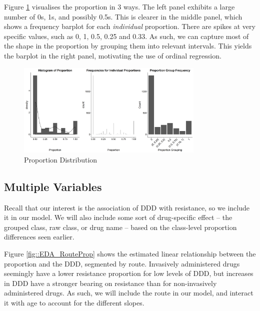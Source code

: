 \documentclass[11pt,twoside]{article}
\numberwithin{Theorem}{section}
\numberwithin{Definition}{section}
\numberwithin{Lemma}{section}
\numberwithin{Algorithm}{section}
\numberwithin{equation}{section}
\begin{document}
\newpage
Figure \ref{fig::2_1_EDA_Prop} visualises the proportion in 3 ways. The left panel exhibits a large number of 0s, 1s, and possibly 0.5s. This is clearer in the middle panel, which shows a frequency barplot for each \textit{individual} proportion. There are spikes at very specific values, such as 0, 1, 0.5, 0.25 and 0.33. As such, we can capture most of the shape in the proportion by grouping them into relevant intervals. This yields the barplot in the right panel, motivating the use of ordinal regression. 

\begin{figure}[!h]
	\centering
	\includegraphics[width = 0.8\textwidth, height = 0.23\textheight]{Figures/2_1_EDA_Prop.png}
	\caption{Proportion Distribution} \label{fig::2_1_EDA_Prop}
\end{figure}

\subsection{Multiple Variables}

Recall that our interest is the association of DDD with resistance, so we include it in our model.   We will also include some sort of drug-specific effect -- the grouped class, raw class, or drug name -- based on the class-level proportion differences seen earlier. 


Figure \ref{fig::EDA_RouteProp} shows the estimated linear relationship between the proportion and the DDD, segmented by route. Invasively administered drugs seemingly have a lower resistance proportion for low levels of DDD, but increases in DDD have a stronger bearing on resistance than for non-invasively administered drugs. As such, we will include the route in our model, and interact it with age to account for the different slopes. 
\end{document}
